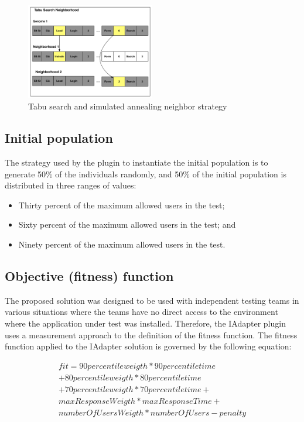 \documentclass[conference]{IEEEtran}
\begin{document}
\begin{figure}[h]
\includegraphics[width=0.5\textwidth]{./images/TabuNE.png}
\caption{Tabu search and simulated annealing neighbor strategy}
\label{fig:neighbourtaby}
\end{figure}


\subsection{Initial population}

The strategy used by the plugin to instantiate the initial population is to generate 50\% of the individuals randomly, and 50\% of the initial population is distributed in three ranges of values:

\begin{itemize}
\item Thirty percent of the maximum allowed users in the test;
\item Sixty percent of the maximum allowed users in the test; and
\item Ninety percent of the maximum allowed users in the test.
\end{itemize}

\subsection{Objective (fitness) function}

The proposed solution was designed to be used with independent testing teams in various situations where the teams have no direct access to the environment where the application under test was installed. Therefore, the IAdapter plugin uses a measurement approach to the definition of the fitness function. The fitness function applied to the IAdapter solution is governed by the following equation:

\begin{equation}
\begin{aligned}
fit=90percentileweigth* 90percentiletime\\
+80percentileweigth*80percentiletime\\+
70percentileweigth*70percentiletime+\\
maxResponseWeigth*maxResponseTime+\\
numberOfUsersWeigth*numberOfUsers-penalty
\end{aligned}
\end{equation}
\end{document}
